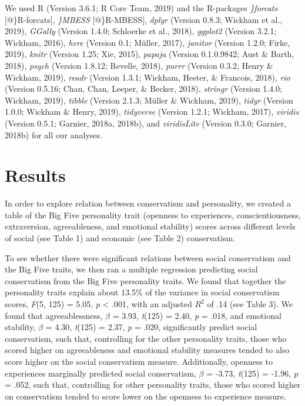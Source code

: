 \documentclass[man]{apa6}
\begin{document}
We used R (Version 3.6.1; R Core Team, 2019) and the R-packages \emph{\}forcats} {[}@\}R-forcats{]}, \emph{\}MBESS} {[}@\}R-MBESS{]}, \emph{dplyr} (Version 0.8.3; Wickham et al., 2019), \emph{GGally} (Version 1.4.0; Schloerke et al., 2018), \emph{ggplot2} (Version 3.2.1; Wickham, 2016), \emph{here} (Version 0.1; Müller, 2017), \emph{janitor} (Version 1.2.0; Firke, 2019), \emph{knitr} (Version 1.25; Xie, 2015), \emph{papaja} (Version 0.1.0.9842; Aust \& Barth, 2018), \emph{psych} (Version 1.8.12; Revelle, 2018), \emph{purrr} (Version 0.3.2; Henry \& Wickham, 2019), \emph{readr} (Version 1.3.1; Wickham, Hester, \& Francois, 2018), \emph{rio} (Version 0.5.16; Chan, Chan, Leeper, \& Becker, 2018), \emph{stringr} (Version 1.4.0; Wickham, 2019), \emph{tibble} (Version 2.1.3; Müller \& Wickham, 2019), \emph{tidyr} (Version 1.0.0; Wickham \& Henry, 2019), \emph{tidyverse} (Version 1.2.1; Wickham, 2017), \emph{viridis} (Version 0.5.1; Garnier, 2018a, 2018b), and \emph{viridisLite} (Version 0.3.0; Garnier, 2018b) for all our analyses.

\hypertarget{results}{%
\section{Results}\label{results}}

In order to explore relation between conservatism and personality, we created a table of the Big Five personality trait (openness to experiences, conscientiousness, extraversion, agreeableness, and emotional stability) scores across different levels of social (see Table 1) and economic (see Table 2) conservatism.

To see whether there were significant relations between social conservatism and the Big Five traits, we then ran a multiple regression predicting social conservatism from the Big Five personality traits. We found that together the personality traits explain about 13.5\% of the variance in social conservatism scores, \emph{F}(5, 125) = 5.05, \emph{p} \textless{} .001, with an adjusted \(R^2\) of .14 (see Table 3). We found that agreeablessness, \(\beta\) = 3.93, \emph{t}(125) = 2.40, \emph{p} = .018, and emotional stability, \(\beta\) = 4.30, \emph{t}(125) = 2.37, \emph{p} = .020, significantly predict social conservatism, such that, controlling for the other personality traits, those who scored higher on agreeableness and emotional stability measures tended to also score higher on the social conservatism measure. Additionally, openness to experiences marginally predicted social conservatism, \(\beta\) = -3.73, \emph{t}(125) = -1.96, \emph{p} = .052, such that, controlling for other personality traits, those who scored higher on conservatism tended to score lower on the openness to experience measure.
\end{document}
